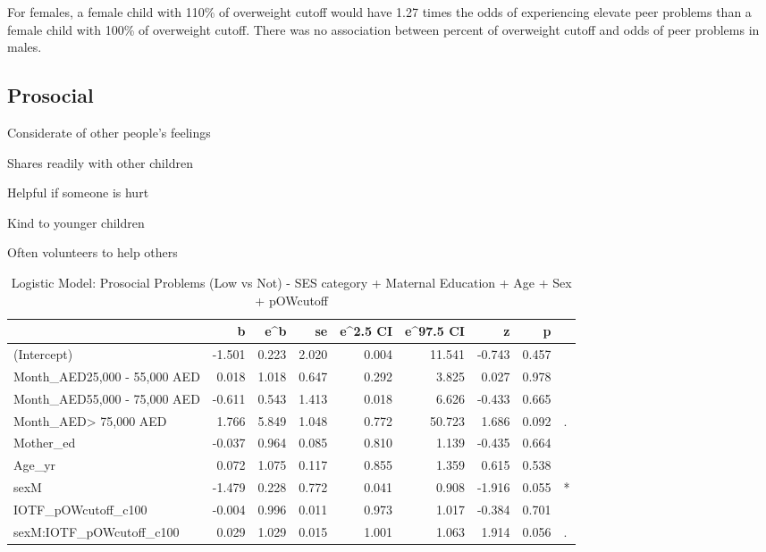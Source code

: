 \documentclass[
]{article}
\begin{document}
\FloatBarrier

For females, a female child with 110\% of overweight cutoff would have
1.27 times the odds of experiencing elevate peer problems than a female
child with 100\% of overweight cutoff. There was no association between
percent of overweight cutoff and odds of peer problems in males.

\FloatBarrier

\FloatBarrier

\hypertarget{prosocial}{%
\subsection{Prosocial}\label{prosocial}}

Considerate of other people's feelings

Shares readily with other children

Helpful if someone is hurt

Kind to younger children

Often volunteers to help others

\FloatBarrier

\begin{table}[!h]

\caption{\label{tab:IOTF_pOWcutoff_prosocialprobs_low_logit}Logistic Model: Prosocial Problems (Low vs Not) - SES category + Maternal Education + Age + Sex + pOWcutoff}
\centering
\begin{tabular}[t]{lrrrrrrrl}
\toprule
  & b & e\textasciicircum{}b & se & e\textasciicircum{}2.5 CI & e\textasciicircum{}97.5 CI & z & p &  \\
\midrule
(Intercept) & -1.501 & 0.223 & 2.020 & 0.004 & 11.541 & -0.743 & 0.457 & \\
Month\_AED25,000 - 55,000 AED & 0.018 & 1.018 & 0.647 & 0.292 & 3.825 & 0.027 & 0.978 & \\
Month\_AED55,000 - 75,000 AED & -0.611 & 0.543 & 1.413 & 0.018 & 6.626 & -0.433 & 0.665 & \\
Month\_AED> 75,000 AED & 1.766 & 5.849 & 1.048 & 0.772 & 50.723 & 1.686 & 0.092 & .\\
Mother\_ed & -0.037 & 0.964 & 0.085 & 0.810 & 1.139 & -0.435 & 0.664 & \\
\addlinespace
Age\_yr & 0.072 & 1.075 & 0.117 & 0.855 & 1.359 & 0.615 & 0.538 & \\
sexM & -1.479 & 0.228 & 0.772 & 0.041 & 0.908 & -1.916 & 0.055 & *\\
IOTF\_pOWcutoff\_c100 & -0.004 & 0.996 & 0.011 & 0.973 & 1.017 & -0.384 & 0.701 & \\
sexM:IOTF\_pOWcutoff\_c100 & 0.029 & 1.029 & 0.015 & 1.001 & 1.063 & 1.914 & 0.056 & .\\
\bottomrule
\end{tabular}
\end{table}
\end{document}
